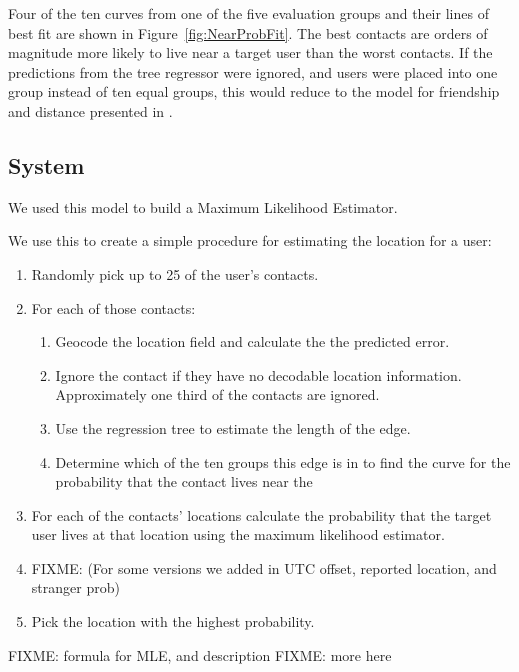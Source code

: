 Four of the ten curves from one of the five evaluation groups and their lines
of best fit are shown in Figure~\ref{fig:NearProbFit}.
%
The best contacts are orders of magnitude more
likely to live near a target user than the worst contacts.
%
If the predictions from the tree regressor were ignored, and users were placed
into one group instead of ten equal groups, this would reduce to the model
for friendship and distance presented in \cite{backstrom2010find}.


\subsection{System}
We used this model to build a Maximum Likelihood Estimator.


We use this to create a simple procedure for estimating the location for a user:
\begin{enumerate}
\item Randomly pick up to 25 of the user's contacts.
\item For each of those contacts:
\begin{enumerate}
    \item Geocode the location field and calculate the the predicted error.
    \item Ignore the contact if they have no decodable location information.
    Approximately one third of the contacts are ignored.
    \item Use the regression tree to estimate the length of the edge.
    \item Determine which of the ten groups this edge is in to find the curve
        for the probability that the contact lives near the
\end{enumerate}
\item For each of the contacts' locations calculate the probability that the
target user lives at that location using the maximum likelihood estimator.
\item FIXME: (For some versions we added in UTC offset, reported location, and stranger prob)
\item Pick the location with the highest probability.
\end{enumerate}

FIXME: formula for MLE, and description
FIXME: more here

